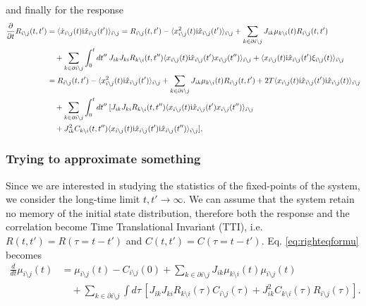 \documentclass[
    preprint,
    linenumbers,
    amsmath,amssymb,amsfonts,
    aps, physrev,
    superscriptaddress,
    10pt,
    bibnotes
    ]{revtex4-2}
\begin{document}
and finally for the response
\begin{subequations}
\begin{align}
\frac{\partial}{\partial t}R_{i\setminus j}(t,t') & =\langle\dot{x}_{i\setminus j}(t){\rm i}\hat{x}_{i\setminus j}(t')\rangle_{i\setminus j}=R_{i\setminus j}(t,t')-\langle x_{i\setminus j}^{2}(t){\rm i}\hat{x}_{i\setminus j}(t')\rangle_{i\setminus j}+\sum_{k\in\partial i\setminus j}J_{ik}\mu_{k\setminus i}(t)R_{i\setminus j}(t,t')\nonumber \\
 & \quad+\sum_{k\in\partial i\setminus j}\int_{0}^{t}dt''\:J_{ik}J_{ki}R_{k\setminus i}(t,t'')\langle x_{i\setminus j}(t){\rm i}\hat{x}_{i\setminus j}(t')x_{i\setminus j}(t'')\rangle_{i\setminus j}+\langle x_{i\setminus j}(t){\rm i}\hat{x}_{i\setminus j}(t')\xi_{i\setminus j}(t)\rangle_{i\setminus j}\\
 & =R_{i\setminus j}(t,t')-\langle x_{i\setminus j}^{2}(t){\rm i}\hat{x}_{i\setminus j}(t')\rangle_{i\setminus j}+\sum_{k\in\partial i\setminus j}J_{ik}\mu_{k\setminus i}(t)R_{i\setminus j}(t,t')+2T\langle x_{i\setminus j}(t){\rm i}\hat{x}_{i\setminus j}(t'){\rm i}\hat{x}_{i\setminus j}(t)\rangle_{i\setminus j}\nonumber \\
 & \quad+\sum_{k\in\partial i\setminus j}\int_{0}^{t}dt''\:[J_{ik}J_{ki}R_{k\setminus i}(t,t'')\langle x_{i\setminus j}(t){\rm i}\hat{x}_{i\setminus j}(t')x_{i\setminus j}(t'')\rangle_{i\setminus j}\nonumber \\
 & \quad+J_{ik}^{2}C_{k\setminus i}(t,t'')\langle x_{i\setminus j}(t){\rm i}\hat{x}_{i\setminus j}(t'){\rm i}\hat{x}_{i\setminus j}(t'')\rangle_{i\setminus j}],
\end{align}
\end{subequations}


\subsubsection{Trying to approximate something}

Since we are interested in studying the statistics of the fixed-points of the system, we consider the long-time limit $t,t'\to\infty$. We can assume that the system retain no memory of the initial state distribution, therefore both the response and the correlation become Time Translational Invariant (TTI), i.e.  $R(t,t')=R(\tau=t-t')$ and $C(t,t')=C(\tau=t-t')$. Eq. \eqref{eq:righteqformu} becomes
\begin{align}
  \frac{d}{dt}\mu_{i\setminus j}(t)& =\mu_{i\setminus j}(t)-C_{i\setminus j}(0)+\sum_{k\in\partial i\setminus j}J_{ik}\mu_{k\setminus i}(t)\mu_{i\setminus j}(t)\nonumber \\
& \quad+\sum_{k\in\partial i\setminus j}\int d\tau\,\left[J_{ik}J_{ki}R_{k\setminus i}(\tau)C_{i\setminus j}(\tau)+J_{ik}^{2}C_{k\setminus i}(\tau)R_{i\setminus j}(\tau)\right].
\label{eq:righteqformuTTI}
\end{align}
\end{document}
